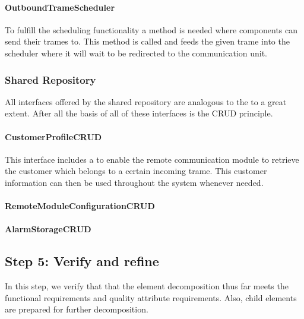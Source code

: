 \paragraph{OutboundTrameScheduler}

\npar To fulfill the scheduling functionality a method is needed where
components can send their trames to. This method is called
 and feeds the given trame into the scheduler where it
will wait to be redirected to the communication unit.

\subsubsection{Shared Repository} 

\npar All interfaces offered by the shared repository are analogous to the
 to a great extent. After all the basis of all of these
interfaces is the CRUD principle.

\paragraph{CustomerProfileCRUD}
\npar This interface includes a  to
enable the remote communication module to retrieve the customer which belongs to
a certain incoming trame. This customer information can then be used throughout
the system whenever needed.

\paragraph{RemoteModuleConfigurationCRUD}

\npar 

\paragraph{AlarmStorageCRUD}

\npar 

\subsection{Step 5: Verify and refine}
\label{add:it1/verification}

\npar In this step, we verify that that the element decomposition thus far meets
the functional requirements and quality attribute requirements. Also, child
elements are prepared for further decomposition.

